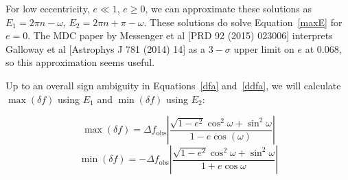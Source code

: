 \documentclass{article}
\begin{document}
\noindent For low eccentricity, $e \ll 1$, $e\geq 0$, we can approximate these solutions as $E_1 = 2\pi n - \omega$, $E_2 = 2\pi n + \pi - \omega$.
These solutions do solve Equation~\ref{maxE} for $e=0$.
The MDC paper by Messenger et al [PRD 92 (2015) 023006] interprets Galloway et al [Astrophys J 781 (2014) 14] as a $3-\sigma$ upper limit on $e$ at 0.068, so this approximation seems useful.

Up to an overall sign ambiguity in Equations~\ref{dfa} and~\ref{ddfa}, we will calculate $\max(\delta f)$ using $E_1$ and $\min(\delta f)$ using $E_2$:

\begin{equation}
\max(\delta f) = \Delta f_\mathrm{obs} \left|\frac{\sqrt{1-e^2} \cos^2 \omega + \sin^2 \omega}{1-e \cos (\omega)} \right|
\label{maxdeltaf}
\end{equation}
\begin{equation}
\min(\delta f) = -\Delta f_\mathrm{obs} \left|\frac{\sqrt{1-e^2} \cos^2\omega + \sin^2 \omega}{1+e \cos \omega} \right|
\label{mindeltaf}
\end{equation}
\end{document}
